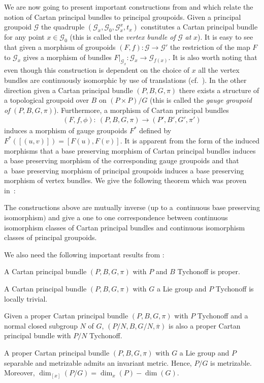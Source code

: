 We are now going to present important constructions from \cite{McK1} and \cite{McK2} which relate the notion of Cartan principal bundles to principal groupoids. Given a principal groupoid $\mathcal{G}$ the quadruple $(\mathcal{G}_x,\mathcal{G}_0,\mathcal{G}^x_x,t_x)$ constitutes a Cartan principal bundle for any point $x\in\mathcal{G}_0$ (this is called the \emph{vertex bundle of} $\mathcal{G}$ \emph{at} $x$). It is easy to see that given a morphism of groupoids $(F,f)\colon \mathcal{G}\rightarrow\mathcal{G}'$ the restriction of the map $F$ to $\mathcal{G}_x$ gives a morphism of bundles $F|_{\mathcal{G}_x}\colon \mathcal{G}_x\rightarrow\mathcal{G}_{f(x)}$. It is also worth noting that even though this construction is dependent on the choice of $x$ all the vertex bundles are continuously isomorphic by use of translations (cf.~\cite{McK1}). In the other direction given a Cartan principal bundle $(P,B,G,\pi)$ there exists a structure of a topological groupoid over $B$ on $(P\times P)\slash G$ (this is called the \emph{gauge groupoid of} $(P,B,G,\pi)$). Furthermore, a morphism of Cartan principal bundles
\begin{gather*}(F,f,\phi)\colon \ (P,B,G,\pi)\rightarrow (P',B',G',\pi')
\end{gather*} induces a morphism of gauge groupoids $F^*$ defined by $F^*([(u,v)])=[F(u),F(v)]$. It is apparent from the form of the induced morphisms that a base preserving morphism of Cartan principal bundles induces a base preserving morphism of the corresponding gauge groupoids and that a~base preserving morphism of principal groupoids induces a base preserving morphism of vertex bundles. We give the following theorem which was proven in~\cite{McK1}:
\begin{tw}\label{CPB} The constructions above are mutually inverse $($up to a~continuous base preserving isomorphism$)$ and give a one to one correspondence between continuous isomorphism classes of Cartan principal bundles and continuous isomorphism classes of principal groupoids.
\end{tw}
We also need the following important results from \cite{P}:
\begin{tw}[{\cite[Proposition 1.2.5]{P}}]\label{Slice2} A Cartan principal bundle $(P,B,G,\pi)$ with $P$ and $B$ Tychonoff is proper.
\end{tw}
\begin{tw}[{\cite[Section 4.1]{P}}]\label{Slice} A Cartan principal bundle $(P,B,G,\pi)$ with $G$ a Lie group and $P$ Tychonoff is locally trivial.
\end{tw}
\begin{tw}[{\cite[Proposition 1.3.2]{P}}] \label{Slice4} Given a proper Cartan principal bundle $(P,B,G,\pi)$ with $P$ Tychonoff and a normal closed subgroup $N$ of $G$, $(P\slash N,B,G\slash N,\overline{\pi})$ is also a proper Cartan principal bundle with $P\slash N$ Tychonoff.
\end{tw}
\begin{tw}[{\cite[Theorem 4.3.4]{P}}]\label{Slice3} A proper Cartan principal bundle $(P,B,G,\pi)$ with $G$ a Lie group and $P$ separable and metrizable admits an invariant metric. Hence, $P\slash G$ is metrizable. Moreover, $\dim_{[x]}(P\slash G)=\dim_x(P)-\dim(G)$.
\end{tw}

